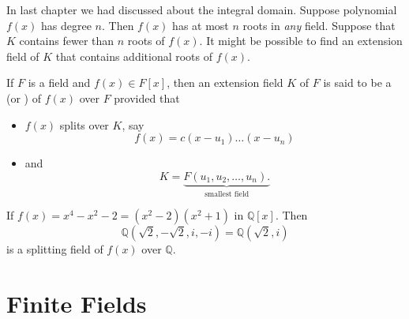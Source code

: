 In last chapter we had discussed about the integral domain. Suppose 
polynomial $f(x)$ has degree $n$. Then $f(x)$ has at most $n$ roots in \textit{any} field. 
Suppose that $K$ contains fewer than $n$ roots of $f(x)$. It might be possible to find an extension field of 
$K$ that contains additional roots of $f(x)$. 

\begin{definition}
    If $F$ is a field and $f(x) \in F[x]$, then an extension field $K$ of $F$ is said to 
    be a  (or ) of $f(x)$ over $F$ provided that 
    \begin{itemize}
        \item $f(x)$ splits over $K$, say 
        \begin{equation}
            f(x) = c(x-u_1)\ldots (x-u_n)
        \end{equation}
        \item and
        \begin{equation}
            K = \underbrace{F(u_1, u_2, \ldots, u_n).}_{\text{smallest field}}
        \end{equation}
    \end{itemize}
\end{definition}

\begin{example}
    If $f(x) = x^4 - x^2 - 2 = (x^2 - 2)(x^2 + 1)$ in $\mathbb{Q}[x]$. Then 
    \[
        \mathbb{Q}(\sqrt{2}, -\sqrt{2}, i, -i) = \mathbb{Q}(\sqrt{2}, i)
    \]
    is a splitting field of $f(x)$ over $\mathbb{Q}$.
\end{example}

\newpage
\section{Finite Fields}

